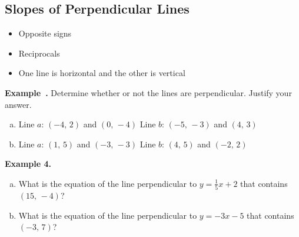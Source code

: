 \documentclass{article}
\newcounter{example}[section]
\newenvironment{example}[1][]{\refstepcounter{example}\par\medskip
   {\color{red}\textbf{Example~\theexample. #1}}}{\medskip}
\begin{document}
\newpage 

\subsection*{Slopes of Perpendicular Lines}


\begin{itemize}
    \item Opposite signs
    \item Reciprocals
    \item One line is horizontal and the other is vertical
\end{itemize}
\vspace{0.2in}

\begin{example}
Determine whether or not the lines are perpendicular. Justify your answer.

\begin{multicols}{2}
\begin{enumerate}[(a)]
    \item Line $a$: $(-4, \, 2)$ and $(0, \, -4)$ \newline Line $b$: $(-5, \, -3)$ and $(4, \, 3)$
    \item Line $a$: $(1, \, 5)$ and $(-3, \, -3)$ \newline Line $b$: $(4, \, 5)$ and $(-2, \, 2)$
\end{enumerate}
\end{multicols}
\begin{minipage}{0.5\textwidth}
\end{minipage}
\begin{minipage}{0.4\textwidth}
\end{minipage}
\end{example}

\vfill 

\textbf{Example 4.}
\begin{enumerate}[(a)]
    \item What is the equation of the line perpendicular to $y=\frac{1}{5}x+2$ that contains $(15, \, -4)$?     \vfill 
    \item What is the equation of the line perpendicular to $y=-3x-5$ that contains $(-3, \, 7)$?       \vfill 
\end{enumerate}
\end{document}
